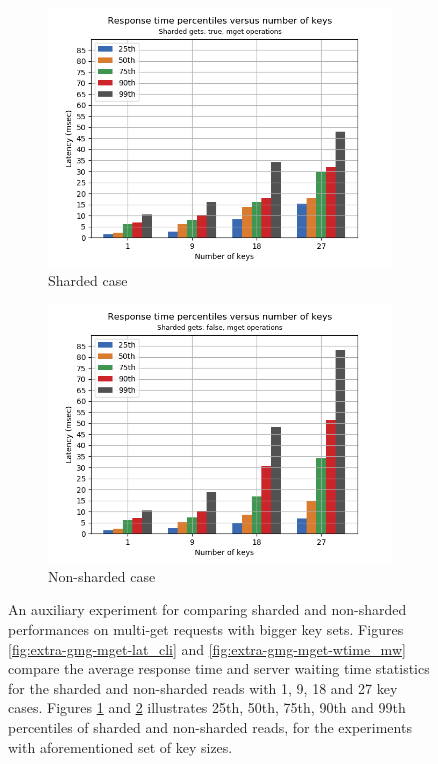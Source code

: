 \documentclass[11pt,a4paper]{article}
\begin{document}
\begin{figure}[h]
\begin{subfigure}{.5\textwidth}
  \centering
  \includegraphics[width=1.0\linewidth ,trim={0 0 0 0},clip]{img/plot/extra-gmg-perc-true.png}
  \caption{Sharded case}
  \label{fig:extra-gmg-perc-true}
\end{subfigure}%
\begin{subfigure}{.5\textwidth}
  \centering
  \includegraphics[width=1.0\linewidth ,trim={0 0 0 0},clip]{img/plot/extra-gmg-perc-false.png}
  \caption{Non-sharded case}
  \label{fig:extra-gmg-perc-false}
\end{subfigure}
\caption{An auxiliary experiment for comparing sharded and non-sharded performances on multi-get requests with bigger key sets. Figures \ref{fig:extra-gmg-mget-lat_cli} and \ref{fig:extra-gmg-mget-wtime_mw} compare the average response time and server waiting time statistics for the sharded and non-sharded reads with 1, 9, 18 and 27 key cases. Figures \ref{fig:extra-gmg-perc-true} and \ref{fig:extra-gmg-perc-false} illustrates 25th, 50th, 75th, 90th and 99th percentiles of sharded and non-sharded reads, for the experiments with aforementioned set of key sizes.}
\label{fig:extra-gmg}
\end{figure}
\end{document}
